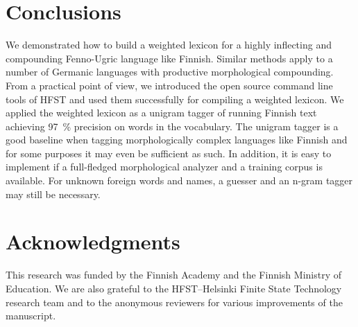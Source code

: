 \documentclass[postprint]{flammie}
\begin{document}
\section{Conclusions}
\label{Sect8}

We demonstrated how to build a weighted lexicon for a highly
inflecting and compounding Fenno-Ugric language like Finnish. Similar
methods apply to a number of Germanic languages with productive
morphological compounding. From a practical point of view, we
introduced the open source command line tools of \textsc{HFST} and
used them successfully for compiling a weighted lexicon. We applied
the weighted lexicon as a unigram tagger of running Finnish text
achieving 97~\% precision on words in the vocabulary. The unigram
tagger is a good baseline when tagging morphologically complex
languages like Finnish and for some purposes it may even be sufficient
as such. In addition, it is easy to implement if a full-fledged
morphological analyzer and a training corpus is available. For unknown
foreign words and names, a guesser and an n-gram tagger may still be
necessary.

\section*{Acknowledgments}
This research was funded by the Finnish Academy and the Finnish
Ministry of Education. We are also grateful to the HFST--Helsinki
Finite State Technology research team and to the anonymous reviewers
for various improvements of the manuscript.


\end{document}
